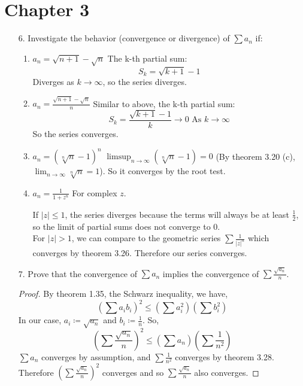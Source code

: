 \documentclass[hidelinks,12pt]{article}
\renewcommand{\leq}{\leqslant}
\begin{document}
\section*{Chapter 3}
\begin{enumerate}
    \item[6.] Investigate the behavior (convergence or divergence) of \(\sum a_{n}\) if: \begin{enumerate}[label=(\alph*).]
            \item \(a_{n}=\sqrt{n+1}-\sqrt{n}\) The k-th partial sum: \[
                    S_{k}=\sqrt{k+1}-1\tag{Everything less than k cancels out!}
            \]
             Diverges as \(k\to\infty\), so the series diverges. 
         \item \(a_{n}=\frac{\sqrt{n+1}-\sqrt{n}}{n}\) Similar to above, the k-th partial sum:
             \[
                 S_{k}=\frac{\sqrt{k+1}-1}{k}\to0\text{ As }k\to\infty
             \]
            So the series converges. 
        \item \(a_{n}=(\sqrt[n]{n}-1)^{n}\) \(\limsup_{n\to\infty}(\sqrt[n]{n}-1)=0\) (By theorem 3.20 (c), \(\lim_{n\to\infty}\sqrt[n]{n}=1\)). So it converges by the root test.
        \item \(a_{n}=\frac{1}{1+z^{n}}\) For complex \(z\).\par\null\par
            If \(|z|\leq1\), the series diverges because the terms will always be at least \(\frac{1}{2}\), so the limit of partial sums does not converge to 0.\\
            For \(|z|>1\), we can compare to the geometric series \(\sum \frac{1}{|z|^{n}}\) which converges by theorem 3.26. Therefore our series converges.
    \end{enumerate}
\item[7.] Prove that the convergence of \(\sum a_{n}\) implies the convergence of \(\sum \frac{\sqrt{a_{n}}}{n}\).
    \begin{proof}
    By theorem 1.35, the Schwarz inequality, we have,
    \[
        \left(\sum a_{i}b_{i}\right)^{2}\leq\left(\sum a^{2}_{i}\right)\left(\sum b^{2}_{i}\right)
    \]
    In our case, \(a_{i}\coloneqq \sqrt{a_{n}}\) and \(b_{i}\coloneqq\frac{1}{n}\). So, \[
        \left(\sum\frac{\sqrt{a_{n}}}{n}\right)^{2}\leq(\sum a_{n})(\sum \frac{1}{n^{2}})
   \]
   \(\sum a_{n}\) converges by assumption, and \(\sum \frac{1}{n^{2}}\) converges by theorem 3.28. Therefore \(\left(\sum\frac{\sqrt{a_{n}}}{n}\right)^{2}\) converges and so \(\sum\frac{\sqrt{a_{n}}}{n}\) also converges.
    \end{proof}
\end{enumerate}
\end{document}
